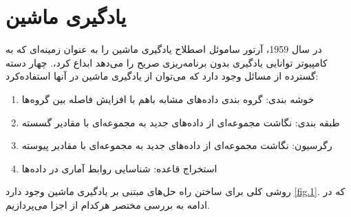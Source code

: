 \chapter{یادگیری ماشین}
در سال 1959، آرتور ساموئل اصطلاح یادگیری ماشین را به عنوان زمینه‌ای که به کامپیوتر توانایی یادگیری بدون برنامه‌ریزی صریح را می‌دهد ابداع کرد،. چهار دسته گسترده از مسائل وجود دارد که می‌توان از یادگیری ماشین در آنها استفاده‌کرد\cite{boutaba2018comprehensive}:
\begin{enumerate}
    \item خوشه‌ بندی:
    گروه بندی داده‌های مشابه باهم با افزایش فاصله بین گروه‌ها 
    \item طبقه ‌بندی: نگاشت مجموعه‌ای از داده‌های جدید به مجموعه‌ای با مقادیر گسسته 
    \item رگرسیون: نگاشت مجموعه‌ای از داده‌های جدید به مجموعه‌ای با مقادیر پیوسته
    \item استخراج قاعده: شناسایی روابط آماری در داده‌ها 
\end{enumerate}

روشی کلی برای ساختن راه حل‌های مبتنی بر یادگیری ماشین وجود دارد \cref{fig.1}. که در ادامه به بررسی مختصر هرکدام از اجزا می‌پردازیم.

